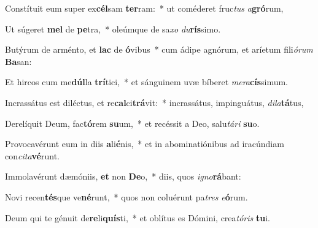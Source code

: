\item Constítuit eum super ex\textbf{cél}sam \textbf{ter}ram:~* ut coméderet fruc\textit{tus} \textit{a}\textbf{gró}rum,
\item Ut súgeret \textbf{mel} de \textbf{pe}tra,~* oleúmque de sa\textit{xo} \textit{du}\textbf{rís}simo.
\item Butýrum de arménto, et \textbf{lac} de \textbf{ó}vibus~* cum ádipe agnórum, et aríetum fili\textit{ó}\textit{rum} \textbf{Ba}san:
\item Et hircos cum me\textbf{dúl}la \textbf{trí}tici,~* et sánguinem uvæ bíberet \textit{me}\textit{ra}\textbf{cís}simum.
\item Incrassátus est diléctus, et re\textbf{cal}ci\textbf{trá}vit:~* incrassátus, impinguátus, \textit{di}\textit{la}\textbf{tá}tus,
\item Derelíquit Deum, fac\textbf{tó}rem \textbf{su}um,~* et recéssit a Deo, salu\textit{tá}\textit{ri} \textbf{su}o.
\item Provocavérunt eum in diis \textbf{a}li\textbf{é}nis,~* et in abominatiónibus ad iracúndiam con\textit{ci}\textit{ta}\textbf{vé}runt.
\item Immolavérunt dæmóniis, \textbf{et} non \textbf{De}o,~* diis, quos \textit{i}\textit{gno}\textbf{rá}bant:
\item Novi recen\textbf{tés}que ve\textbf{né}runt,~* quos non coluérunt pa\textit{tres} \textit{e}\textbf{ó}rum.
\item Deum qui te génuit de\textbf{re}li\textbf{quís}ti,~* et oblítus es Dómini, crea\textit{tó}\textit{ris} \textbf{tu}i.
